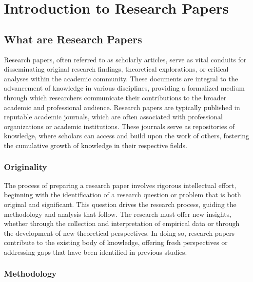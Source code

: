 \documentclass[
]{book}
\begin{document}
\chapter{Introduction to Research Papers}\label{introduction-to-research-papers}

\section{What are Research Papers}\label{what-are-research-papers}

Research papers, often referred to as scholarly articles, serve as vital conduits for disseminating original research findings, theoretical explorations, or critical analyses within the academic community. These documents are integral to the advancement of knowledge in various disciplines, providing a formalized medium through which researchers communicate their contributions to the broader academic and professional audience. Research papers are typically published in reputable academic journals, which are often associated with professional organizations or academic institutions. These journals serve as repositories of knowledge, where scholars can access and build upon the work of others, fostering the cumulative growth of knowledge in their respective fields.

\subsection*{Originality}\label{originality}

The process of preparing a research paper involves rigorous intellectual effort, beginning with the identification of a research question or problem that is both original and significant. This question drives the research process, guiding the methodology and analysis that follow. The research must offer new insights, whether through the collection and interpretation of empirical data or through the development of new theoretical perspectives. In doing so, research papers contribute to the existing body of knowledge, offering fresh perspectives or addressing gaps that have been identified in previous studies.

\subsection*{Methodology}\label{methodology}
\end{document}
